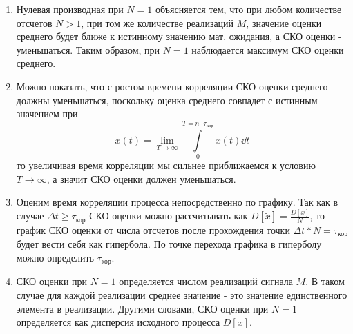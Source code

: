 \begin{enumerate}
	\item Нулевая производная при $N=1$ объясняется тем, что при любом количестве отсчетов $N>1$, при том же
	количестве реализаций $M$, значение оценки среднего будет ближе к истинному значению мат. ожидания, а СКО оценки - уменьшаться. Таким
	образом, при $N=1$ наблюдается максимум СКО оценки среднего.
    \item Можно показать, что с ростом времени корреляции СКО оценки среднего должны уменьшаться, поскольку оценка среднего совпадет с истинным значением при
        \begin{equation}
            \label{eq:}
            \tilde x(t) = \lim_{T \to \infty} \int\limits_{0}^{T = n\cdot \tau_{\text{кор}}}  x(t) \dd{t}
		\end{equation}
		то увеличивая время корреляции мы сильнее приближаемся к условию $T \to \infty$, а значит СКО оценки должен уменьшаться.
	\item Оценим время корреляции процесса непосредственно по графику. Так как в случае $\Delta t \ge \tau_\text{кор}$ СКО
	оценки можно рассчитывать как $D[\tilde{x}] = \frac{D[x]}{N}$, то график СКО оценки от числа отсчетов после
	прохождения точки $\Delta t * N = \tau_\text{кор}$ будет вести себя как гипербола. По точке перехода графика в гиперболу
	можно определить $\tau_\text{кор}$.
	\item СКО оценки при $N=1$ определяется числом реализаций сигнала $M$. В таком случае для каждой
	реализации среднее значение - это значение единственного элемента в реализации. Другими словами, СКО оценки при
	$N=1$ определяется как дисперсия исходного процесса $D[x]$.
	

\end{enumerate}
